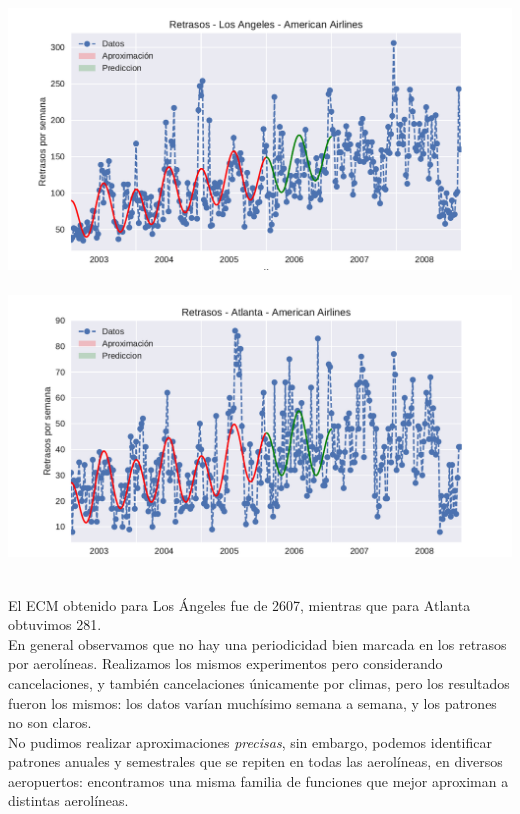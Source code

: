 {\centering
  \includegraphics[width=1.0\linewidth]{informe/imagenes/retrasosAmericanAirlinesLAvol3.pdf}
}
$ $\newline
{\centering
  \includegraphics[width=1.0\linewidth]{informe/imagenes/retrasosAmericanAirlinesATLvol3.pdf}
}
$ $\newline

El ECM obtenido para Los Ángeles fue de 2607, mientras que para Atlanta obtuvimos 281. \\

En general observamos que no hay una periodicidad bien marcada en los retrasos por aerolíneas. Realizamos los mismos experimentos pero considerando cancelaciones, y también cancelaciones únicamente por climas, pero los resultados fueron los mismos: los datos varían muchísimo semana a semana, y los patrones no son claros. \\

No pudimos realizar aproximaciones \textit{precisas}, sin embargo, podemos identificar patrones anuales y semestrales que se repiten en todas las aerolíneas, en diversos aeropuertos: encontramos una misma familia de funciones que mejor aproximan a distintas aerolíneas. \\


